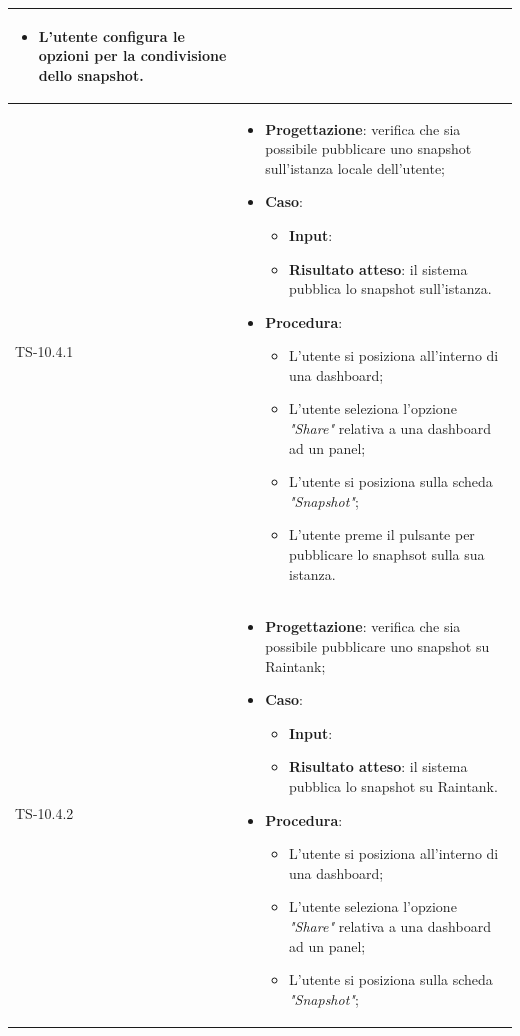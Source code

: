 \begin{longtable}{|C{2.5cm}|C{13cm}|}
\begin{itemize}
\begin{itemize}
		\item L'utente configura le opzioni per la condivisione dello snapshot.
	\end{itemize} 
\end{itemize}
	 \\
	\hline
	{TS-10.4.1} &
\begin{itemize}
	\item \textbf{Progettazione}: verifica che sia possibile pubblicare uno
	snapshot sull'istanza locale dell'utente;
	\item \textbf{Caso}: 
	\begin{itemize}
		\item \textbf{Input}: 
		\item \textbf{Risultato atteso}: il sistema pubblica lo snapshot sull'istanza.
	\end{itemize}
	\item \textbf{Procedura}:
	\begin{itemize}
		\item L'utente si posiziona all'interno di una dashboard;
		\item L'utente seleziona l'opzione \emph{"Share"} relativa a una dashboard ad un panel;
		\item L'utente si posiziona sulla scheda \emph{"Snapshot"};
		\item L'utente preme il pulsante per pubblicare lo snaphsot sulla sua istanza.
	\end{itemize} 
\end{itemize}
	  \\
	\hline
	{TS-10.4.2} & 
\begin{itemize}
	\item \textbf{Progettazione}: verifica che sia possibile pubblicare uno
	snapshot su Raintank;
	\item \textbf{Caso}: 
	\begin{itemize}
		\item \textbf{Input}: 
		\item \textbf{Risultato atteso}: il sistema pubblica lo snapshot su Raintank.
	\end{itemize}
	\item \textbf{Procedura}:
	\begin{itemize}
		\item L'utente si posiziona all'interno di una dashboard;
		\item L'utente seleziona l'opzione \emph{"Share"} relativa a una dashboard ad un panel;
		\item L'utente si posiziona sulla scheda \emph{"Snapshot"};

\end{itemize}
\end{itemize}
\end{longtable}
